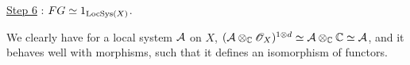 \begin{mydemo}
\underline{Step 6} : $FG \simeq 1_{\text{LocSys}(X)}$.

\smallskip
We clearly have for a local system $\mathcal{A}$ on $X$, $(\mathcal{A} \otimes_{\mathbb{C}} \mathscr{O}_X)^{1 \otimes d} \simeq \mathcal{A} \otimes_{\mathbb{C}} \mathbb{C} \simeq \mathcal{A}$, and it behaves well with morphisms, such that it defines an isomorphism of functors.



\end{mydemo}